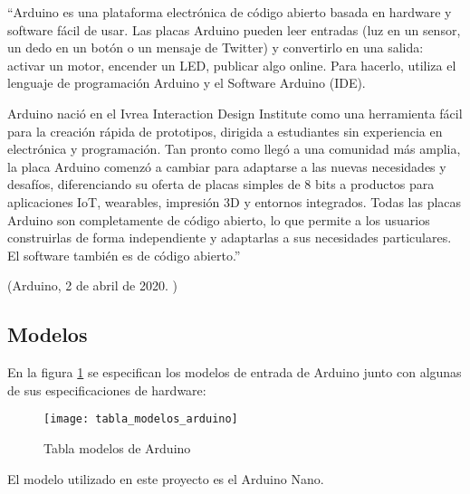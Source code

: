             ``Arduino es una plataforma electrónica de código abierto basada en hardware y software fácil de usar. Las
            placas Arduino pueden leer entradas (luz en un sensor, un dedo en un botón o un mensaje de Twitter) y
            convertirlo en una salida: activar un motor, encender un LED, publicar algo online. Para hacerlo, utiliza
            el lenguaje de programación Arduino y el Software Arduino (IDE).

            Arduino nació en el Ivrea Interaction Design Institute como una herramienta fácil para la creación rápida de
            prototipos, dirigida a estudiantes sin experiencia en electrónica y programación. Tan pronto como llegó a
            una comunidad más amplia, la placa Arduino comenzó a cambiar para adaptarse a las nuevas necesidades y
            desafíos, diferenciando su oferta de placas simples de 8 bits a productos para aplicaciones IoT, wearables,
            impresión 3D y entornos integrados. Todas las placas Arduino son completamente de código abierto, lo que
            permite a los usuarios construirlas de forma independiente y adaptarlas a sus necesidades particulares. El
            software también es de código abierto.''

            \begin{flushright}
                (Arduino, 2 de abril de 2020. \cite{arduino_introduction})
            \end{flushright}
        

        \subsection{Modelos} %
        \label{sub:ModelosArduino}

            En la figura \ref{fig:ImagenModelosArduino} se especifican los modelos de entrada de Arduino junto con algunas de sus
            especificaciones de hardware\cite{arduino_compare}:

            \begin{figure}[ht]
                \centering
                \texttt{[image: tabla\_modelos\_arduino]}
                \caption{Tabla modelos de Arduino\cite{arduino_compare}\label{fig:ImagenModelosArduino}}
            \end{figure}

            El modelo utilizado en este proyecto es el Arduino Nano.
        
